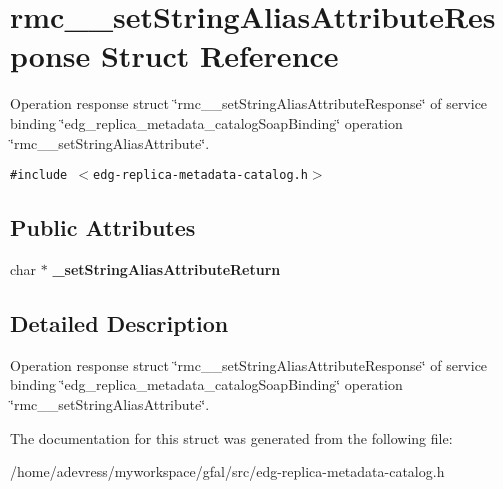 \section{rmc\_\-\_\-set\-String\-Alias\-Attribute\-Response Struct Reference}
\label{structrmc____setStringAliasAttributeResponse}
Operation response struct \char`\"{}rmc\_\-\_\-set\-String\-Alias\-Attribute\-Response\char`\"{} of service binding \char`\"{}edg\_\-replica\_\-metadata\_\-catalog\-Soap\-Binding\char`\"{} operation \char`\"{}rmc\_\-\_\-set\-String\-Alias\-Attribute\char`\"{}.  


{\tt \#include $<$edg-replica-metadata-catalog.h$>$}

\subsection*{Public Attributes}
\begin{CompactItemize}
\item 
char $\ast$ \textbf{\_\-set\-String\-Alias\-Attribute\-Return}\label{structrmc____setStringAliasAttributeResponse_c6acc1b54941a4537289a14d2a515c56}

\end{CompactItemize}


\subsection{Detailed Description}
Operation response struct \char`\"{}rmc\_\-\_\-set\-String\-Alias\-Attribute\-Response\char`\"{} of service binding \char`\"{}edg\_\-replica\_\-metadata\_\-catalog\-Soap\-Binding\char`\"{} operation \char`\"{}rmc\_\-\_\-set\-String\-Alias\-Attribute\char`\"{}. 



The documentation for this struct was generated from the following file:\begin{CompactItemize}
\item 
/home/adevress/myworkspace/gfal/src/edg-replica-metadata-catalog.h\end{CompactItemize}
